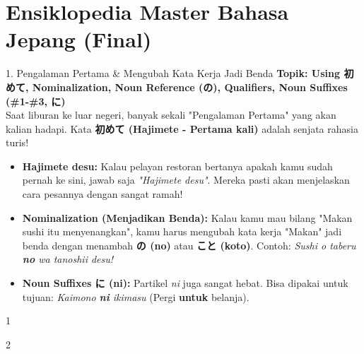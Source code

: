 ﻿\chapter{Ensiklopedia Master Bahasa Jepang (Final)}

\begin{lessonbox}{1. Pengalaman Pertama \& Mengubah Kata Kerja Jadi Benda}
    \textbf{Topik: Using 初めて, Nominalization, Noun Reference (の), Qualifiers, Noun Suffixes (\#1-\#3, に)} \\
    Saat liburan ke luar negeri, banyak sekali "Pengalaman Pertama" yang akan kalian hadapi. Kata \textbf{初めて (Hajimete - Pertama kali)} adalah senjata rahasia turis!
    \begin{itemize}
        \item \textbf{Hajimete desu:} Kalau pelayan restoran bertanya apakah kamu sudah pernah ke sini, jawab saja \textit{"Hajimete desu"}. Mereka pasti akan menjelaskan cara pesannya dengan sangat ramah!
        \item \textbf{Nominalization (Menjadikan Benda):} Kalau kamu mau bilang "Makan sushi itu menyenangkan", kamu harus mengubah kata kerja "Makan" jadi benda dengan menambah \textbf{の (no)} atau \textbf{こと (koto)}. Contoh: \textit{Sushi o taberu \textbf{no} wa tanoshii desu!}
        \item \textbf{Noun Suffixes に (ni):} Partikel \textit{ni} juga sangat hebat. Bisa dipakai untuk tujuan: \textit{Kaimono \textbf{ni} ikimasu} (Pergi \textbf{untuk} belanja).
    \end{itemize}
\end{lessonbox}

\begin{convobox}{1}
    \noindent
      

    \vspace{1.5em}
\end{convobox}

\begin{convobox}{2}
    \noindent
      
      

    \vspace{1.5em}
\end{convobox}

